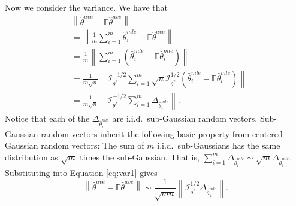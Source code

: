 \documentclass[twoside]{article}
\newcommand{\zero}{\text{\textbf{0}}}
\newcommand{\E}{\mathbb{E}}
\newcommand{\w}{\theta}
\newcommand{\wave}{\hat\w^{ave}}
\newcommand{\wmle}{\hat\w^{mle}}
\newcommand{\wstar}{{\w^{*}}}
\newcommand{\I}{\mathcal I}
\newcommand{\normal}[2]{\ensuremath{\mathcal{N}\left({{#1}},{{#2}}\right)}}
\newcommand{\ltwobig}[1]{{\left\lVert {#1} \right\rVert}}
\begin{document}
Now we consider the variance.
We have that
\begin{align}
&\ltwobig{\wave-\E\wave}
\\&=
\ltwobig{\frac{1}{m}\sum_{i=1}^m\wmle_i-\E\wave}
\label{eq:var1}
\\&=
\frac{1}{m}\ltwobig{\sum_{i=1}^m\left(\wmle_i-\E\wmle_i\right)}
\\&=
\frac{1}{m\sqrt{n}}\ltwobig{\I^{-1/2}_\wstar\sum_{i=1}^m\sqrt{n}\I^{1/2}_\wstar\left(\wmle_i-\E\wmle_i\right)}
\\&=
\frac{1}{m\sqrt{n}}\ltwobig{\I^{-1/2}_\wstar\sum_{i=1}^m\Delta_{\wmle_i}}
\label{eq:var1}
.
\end{align}
Notice that each of the $\Delta_{\wmle_i}$ are i.i.d.\ sub-Gaussian random vectors.
Sub-Gaussian random vectors inherit the following basic property from centered Gaussian random vectors:
The sum of $m$ i.i.d.\ sub-Gaussians has the same distribution as $\sqrt{m}$ times the sub-Gaussian.
That is, $\sum_{i=1}^m \Delta_{\wmle_i} \sim \sqrt{m}\Delta_{\wmle_1}$.
Substituting into Equation \ref{eq:var1} gives
\begin{equation}
\ltwobig{\wave-\E\wave}
\sim
\frac{1}{\sqrt{mn}}\ltwobig{\I^{1/2}_\wstar\Delta_{\wmle_1}}
.
\label{eq:var2}
\end{equation}

\end{document}

